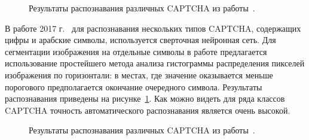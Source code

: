 \documentclass[a4paper,12pt,russian]{article} %
\begin{document}
\begin{figure}[t!]
	\caption{
		Результаты распознавания различных CAPTCHA из работы~\cite{wang2017combining}.
        }
        \label{fig:rev3}
\end{figure}

В работе 2017 г.~\cite{wang2017combining} для распознавания нескольких типов CAPTCHA, содержащих цифры и арабские символы, используется сверточная нейронная сеть.
Для сегментации изображения на отдельные символы в работе предлагается использование простейшего метода анализа гистограммы распределения пикселей изображения по горизонтали: в местах, где значение оказывается меньше порогового предполагается окончание очередного символа.
Результаты распознавания приведены на рисунке~\ref{fig:rev3}.
Как можно видеть для ряда классов CAPTCHA точность автоматического распознавания является очень высокой.

\begin{figure}[t!]
	\caption{
		Результаты распознавания различных CAPTCHA из работы~\cite{hussain2016segmentation}.
        }
        \label{fig:rev4}
\end{figure}
\end{document}
